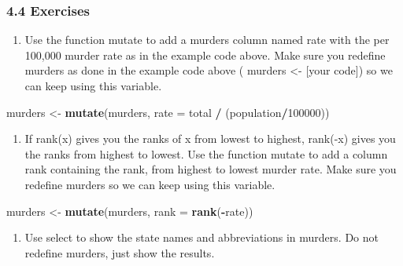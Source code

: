 \documentclass[
]{article}
\newenvironment{Shaded}{\begin{snugshade}}{\end{snugshade}}
\newcommand{\AttributeTok}[1]{\textcolor[rgb]{0.13,0.29,0.53}{#1}}
\newcommand{\DecValTok}[1]{\textcolor[rgb]{0.00,0.00,0.81}{#1}}
\newcommand{\FunctionTok}[1]{\textcolor[rgb]{0.13,0.29,0.53}{\textbf{#1}}}
\newcommand{\NormalTok}[1]{#1}
\newcommand{\OtherTok}[1]{\textcolor[rgb]{0.56,0.35,0.01}{#1}}
\newcommand{\SpecialCharTok}[1]{\textcolor[rgb]{0.81,0.36,0.00}{\textbf{#1}}}
\providecommand{\tightlist}{%
  \setlength{\itemsep}{0pt}\setlength{\parskip}{0pt}}
\begin{document}
\hypertarget{exercises-1}{%
\subsubsection{4.4 Exercises}\label{exercises-1}}

\begin{enumerate}
\def\labelenumi{\arabic{enumi}.}
\tightlist
\item
  Use the function mutate to add a murders column named rate with the
  per 100,000 murder rate as in the example code above. Make sure you
  redefine murders as done in the example code above ( murders
  \textless- {[}your code{]}) so we can keep using this variable.
\end{enumerate}

\begin{Shaded}
\begin{Highlighting}[]
\NormalTok{murders }\OtherTok{\textless{}{-}} \FunctionTok{mutate}\NormalTok{(murders, }\AttributeTok{rate =}\NormalTok{ total }\SpecialCharTok{/}\NormalTok{ (population}\SpecialCharTok{/}\DecValTok{100000}\NormalTok{))}
\end{Highlighting}
\end{Shaded}

\begin{enumerate}
\def\labelenumi{\arabic{enumi}.}
\setcounter{enumi}{1}
\tightlist
\item
  If rank(x) gives you the ranks of x from lowest to highest, rank(-x)
  gives you the ranks from highest to lowest. Use the function mutate to
  add a column rank containing the rank, from highest to lowest murder
  rate. Make sure you redefine murders so we can keep using this
  variable.
\end{enumerate}

\begin{Shaded}
\begin{Highlighting}[]
\NormalTok{murders }\OtherTok{\textless{}{-}} \FunctionTok{mutate}\NormalTok{(murders, }\AttributeTok{rank =} \FunctionTok{rank}\NormalTok{(}\SpecialCharTok{{-}}\NormalTok{rate))}
\end{Highlighting}
\end{Shaded}

\begin{enumerate}
\def\labelenumi{\arabic{enumi}.}
\setcounter{enumi}{2}
\tightlist
\item
  Use select to show the state names and abbreviations in murders. Do
  not redefine murders, just show the results.
\end{enumerate}
\end{document}
